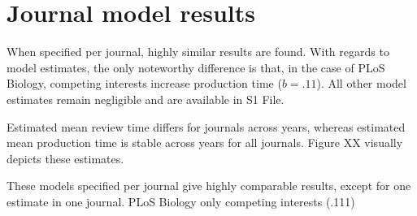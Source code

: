\section*{Journal model results}
When specified per journal, highly similar results are found. With regards to model estimates, the only noteworthy difference is that, in the case of PLoS Biology, competing interests increase production time ($b=.11$). All other model estimates remain negligible and are available in S1 File.

Estimated mean review time differs for journals across years, whereas estimated mean production time is stable across years for all journals. Figure XX visually depicts these estimates. 

These models specified per journal give highly comparable results, except for one estimate in one journal. PLoS Biology only competing interests (.111)